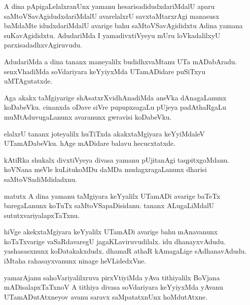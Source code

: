 \documentclass{article}
\begin{document}
\begin{mn}%
A dina pApigaLelalxranUnx yamanu hesarisadidudxdariMdalU aparu saMtoVSavAgidudxdariMdalU 
avarelalxrU savxtaMtarxrAgi manasusx baMdaMte idudxdariMdalU avarige bahu saMtoVSavAgididxtu 
Adina yamana suKavAgididxtu. AdudariMda I yamadivxtiVyeyu mUru loVkadalilxyU 
parxisadadhxvAgiruvudu.
\end{mn}

\begin{mn}%
AdudariMda a dina tananx maneyalilx budidhxvaMtanu UTa mADabAradu. senxVhadiMda soVdariyara 
keYyiyxMda UTamADidare puSiTxyu uMTAgutatxde.
\end{mn}

\begin{mn}%
Aga akakx taMgiyarige shAsatxrXvidhAnadiMda aneVka dAnagaLanunx koDabeVku. cinanxda oDave siVre 
pupupxsagaLu pUjeya padAthaRgaLu muMtAduvugaLanunx avaranunx gwravisi koDabeVku.
\end{mn}

\begin{mn}%
elalxrU tananx joteyalilx huTiTxda akakxtaMgiyara keYyiMdaleV UTamADabeVku. hAge mADidare balavu 
hecucxtatxde.
\end{mn}

\begin{mn}%
kAtiRka shukalx divxtiVyeya divasa yamanu pUjitanAgi taqpitxgoMdanu. koVNana meVle kuLitukoMDu 
daMDa mudagxragaLanunx dharisi saMtoVSadiMdidadxnu.
\end{mn}

\begin{mn}%
matutx A dina yamanu taMgiyara keYyalilx UTamADi avarige baTeTx baregaLanunx koTuTx 
saMtoVSapaDisidanu. tananx ALugaLiMdalU sututxvariyalapxTaTxnu.
\end{mn}

\begin{mn}%
hiVge akekxtaMgiyara keYyalilx UTamADi avarige bahu mAnavanunx koTaTxvarige vaSaRdavaregU 
jagaKLaviruvudilalx. idu dhanayxvAdudu. yashasasxnunx koDatakakxdudx. dhamaR athaR kAmagaLige 
sAdhanavAdudu. iMtaha rahasayxvanunx ninage heVLidedxVne.
\end{mn}

\begin{mn}%
yamarAjanu sahoVariyalilxruva pirxVtiyiMda yAva tithiyalilx BoVjana mADisalapxTaTxnoV A tithiya 
divasa soVdariyara keYyiyxMda yAvanu UTamADutAtxneyov avanu saravx saMpatatxnUnx hoMdutAtxne.
\end{mn}
\end{document}
